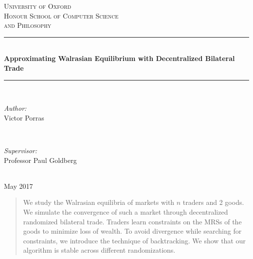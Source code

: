 \documentclass[12pt,a4paper,titlepage]{article}
\begin{document}
\begin{titlepage}

\newcommand{\HRule}{\rule{\linewidth}{0.5mm}} %

\center %
 
\textsc{\LARGE University of Oxford}\\[1.5cm] %
\textsc{\LARGE Honour School of Computer Science \\[0.2cm] and Philosophy}\\[0.5cm] %

\HRule \\[0.4cm]
{ \LARGE \bfseries Approximating Walrasian Equilibrium with Decentralized Bilateral Trade}\\[0.3cm] %
\HRule \\[2cm]
 
\begin{minipage}{0.45\textwidth}
\begin{flushleft} \Large
\emph{Author:}\\
Victor Porras %
\end{flushleft}
\end{minipage}
~
\begin{minipage}{0.45\textwidth}
\begin{flushright} \Large
\emph{Supervisor:} \\
Professor Paul Goldberg %
\end{flushright}
\end{minipage}\\[2cm]

{\Large {May 2017}}\\[2cm]

 

\vfill %

\end{titlepage}

\begin{abstract}
  We study the Walrasian equilibria of markets with $n$ traders and 2 goods.
  We simulate the convergence of such a market through decentralized randomized bilateral trade.
  Traders learn constraints on the MRSs of the goods to minimize loss of wealth.
  To avoid divergence while searching for constraints, we introduce the technique of backtracking.
  We show that our algorithm is stable across different randomizations.
\end{abstract}
\end{document}
